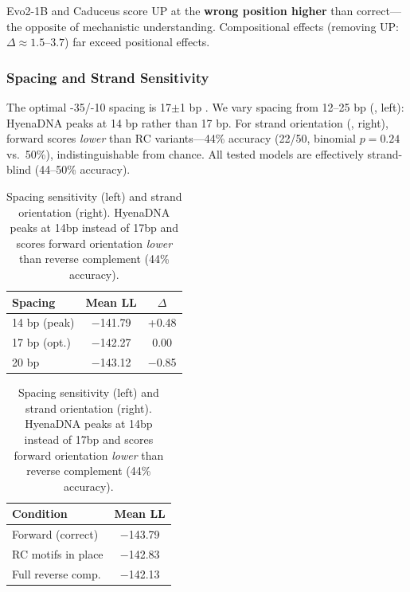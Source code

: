 \documentclass{article}
\begin{document}
Evo2-1B and Caduceus score UP at the \textbf{wrong position higher} than correct---the opposite of mechanistic understanding. Compositional effects (removing UP: $\Delta \approx 1.5$--$3.7$) far exceed positional effects.

\subsubsection{Spacing and Strand Sensitivity}

The optimal -35/-10 spacing is 17$\pm$1 bp \citep{harley1987analysis,murakami2002structural}. We vary spacing from 12--25 bp (, left): HyenaDNA peaks at 14 bp rather than 17 bp. For strand orientation (, right), forward scores \textit{lower} than RC variants---44\% accuracy (22/50, binomial $p = 0.24$ vs.\ 50\%), indistinguishable from chance. All tested models are effectively strand-blind (44--50\% accuracy).

\begin{table}[ht]
\caption{Spacing sensitivity (left) and strand orientation (right). HyenaDNA peaks at 14bp instead of 17bp and scores forward orientation \textit{lower} than reverse complement (44\% accuracy).}
\label{tab:spacing_strand}
\vskip 0.05in
\begin{center}
\small
\begin{minipage}{0.48\textwidth}
\centering
\begin{tabular}{lcc}
\toprule
Spacing & Mean LL & $\Delta$ \\
\midrule
14 bp (peak) & $-$141.79 & +0.48 \\
17 bp (opt.) & $-$142.27 & 0.00 \\
20 bp & $-$143.12 & $-$0.85 \\
\bottomrule
\end{tabular}
\end{minipage}
\hfill
\begin{minipage}{0.48\textwidth}
\centering
\begin{tabular}{lc}
\toprule
Condition & Mean LL \\
\midrule
Forward (correct) & $-$143.79 \\
RC motifs in place & $-$142.83 \\
Full reverse comp. & $-$142.13 \\
\bottomrule
\end{tabular}
\end{minipage}
\end{center}
\vskip -0.1in
\end{table}
\end{document}
